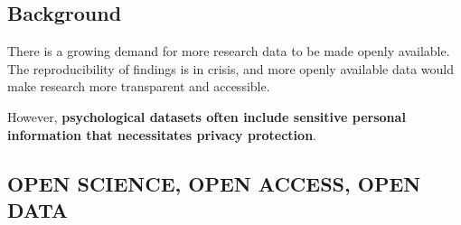 \documentclass[a0,portrait]{a0poster}
\begin{document}
\vspace{1cm}

\begin{multicols}{3} %

\large %
\section{Background}

There is a growing demand for more research data to be made openly available.
The reproducibility of findings is in crisis, and more openly available data would make research more transparent and accessible.

However, \textbf{psychological datasets often include sensitive %
personal information that necessitates privacy protection}.

\subsection{OPEN SCIENCE, OPEN ACCESS, OPEN DATA}


\end{multicols}
\end{document}

